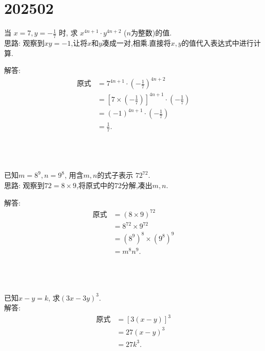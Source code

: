 \section{202502}

\item{
    当 $ x=7, y=-\frac{1}{7}$ 时, 求 $x^{4n+1}\cdot y^{4n+2}$ ($n$为整数)的值.
    \ifshowSolution
    \fangsong{}
    \\
    思路: 观察到$xy=-1$,让将$x$和$y$凑成一对,相乘.直接将$x, y$的值代入表达式中进行计算.

    解答: 
    \begin{align*}
        \mbox{原式} &= 7^{4n+1}\cdot \left(-\frac{1}{7}\right) ^{4n+2}\\
        &= [7\times(-\frac{1}{7})]^{4n+1} \cdot(-\frac{1}{7})\\
        &= (-1)^{4n+1} \cdot(-\frac{1}{7})\\
        &= \frac{1}{7}.
    \end{align*}
    \fi
    \unless\ifshowSolution
    \\ \\ \\
    \fi
} 

\item{
    已知$ m=8^9, n=9^8 $, 用含$m, n$的式子表示 $72^{72}$.
    \ifshowSolution
    \fangsong{}
    \\
    思路: 观察到$72=8\times 9$,将原式中的72分解,凑出$m, n$.
    
    解答: 
    \begin{align*}
        \mbox{原式} &= (8\times 9)^{72}\\
        &= 8^{72}\times 9^{72}\\
        &= (8^9)^8\times (9^8)^9\\
        &= m^8 n^9.
    \end{align*}
    \fi
    \unless\ifshowSolution
    \\ \\ \\
    \fi
} 

\item{
    已知$x-y=k$, 求$(3x-3y)^3.$
    \ifshowSolution
    \fangsong{}
    \\
    解答: 
    \begin{align*}
        \mbox{原式} &= [3(x-y)]^3\\
        &= 27(x-y)^3\\
        &= 27k^3.
    \end{align*}
    \fi
    \unless\ifshowSolution
    \\ \\ \\
    \fi
} 

